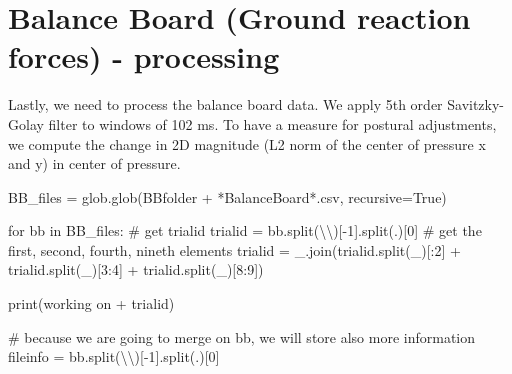\documentclass[
  letterpaper,
  DIV=11,
  numbers=noendperiod]{scrreprt}
\newenvironment{Shaded}{\begin{snugshade}}{\end{snugshade}}
\newcommand{\BuiltInTok}[1]{\textcolor[rgb]{0.00,0.23,0.31}{#1}}
\newcommand{\CharTok}[1]{\textcolor[rgb]{0.13,0.47,0.30}{#1}}
\newcommand{\CommentTok}[1]{\textcolor[rgb]{0.37,0.37,0.37}{#1}}
\newcommand{\ControlFlowTok}[1]{\textcolor[rgb]{0.00,0.23,0.31}{#1}}
\newcommand{\DecValTok}[1]{\textcolor[rgb]{0.68,0.00,0.00}{#1}}
\newcommand{\KeywordTok}[1]{\textcolor[rgb]{0.00,0.23,0.31}{#1}}
\newcommand{\NormalTok}[1]{\textcolor[rgb]{0.00,0.23,0.31}{#1}}
\newcommand{\OperatorTok}[1]{\textcolor[rgb]{0.37,0.37,0.37}{#1}}
\newcommand{\StringTok}[1]{\textcolor[rgb]{0.13,0.47,0.30}{#1}}
\newcommand{\VariableTok}[1]{\textcolor[rgb]{0.07,0.07,0.07}{#1}}
\begin{document}

\chapter{Balance Board (Ground reaction forces) -
processing}\label{balance-board-ground-reaction-forces---processing}

Lastly, we need to process the balance board data. We apply 5th order
Savitzky-Golay filter to windows of 102 ms. To have a measure for
postural adjustments, we compute the change in 2D magnitude (L2 norm of
the center of pressure x and y) in center of pressure.

\begin{Shaded}
\begin{Highlighting}[]
\NormalTok{BB\_files }\OperatorTok{=}\NormalTok{ glob.glob(BBfolder }\OperatorTok{+} \StringTok{\textquotesingle{}*BalanceBoard*.csv\textquotesingle{}}\NormalTok{, recursive}\OperatorTok{=}\VariableTok{True}\NormalTok{)}

\ControlFlowTok{for}\NormalTok{ bb }\KeywordTok{in}\NormalTok{ BB\_files:}
    \CommentTok{\# get trialid}
\NormalTok{    trialid }\OperatorTok{=}\NormalTok{ bb.split(}\StringTok{\textquotesingle{}}\CharTok{\textbackslash{}\textbackslash{}}\StringTok{\textquotesingle{}}\NormalTok{)[}\OperatorTok{{-}}\DecValTok{1}\NormalTok{].split(}\StringTok{\textquotesingle{}.\textquotesingle{}}\NormalTok{)[}\DecValTok{0}\NormalTok{]}
    \CommentTok{\# get the first, second, fourth, nineth elements}
\NormalTok{    trialid }\OperatorTok{=} \StringTok{\textquotesingle{}\_\textquotesingle{}}\NormalTok{.join(trialid.split(}\StringTok{\textquotesingle{}\_\textquotesingle{}}\NormalTok{)[:}\DecValTok{2}\NormalTok{] }\OperatorTok{+}\NormalTok{ trialid.split(}\StringTok{\textquotesingle{}\_\textquotesingle{}}\NormalTok{)[}\DecValTok{3}\NormalTok{:}\DecValTok{4}\NormalTok{] }\OperatorTok{+}\NormalTok{ trialid.split(}\StringTok{\textquotesingle{}\_\textquotesingle{}}\NormalTok{)[}\DecValTok{8}\NormalTok{:}\DecValTok{9}\NormalTok{])}

    \BuiltInTok{print}\NormalTok{(}\StringTok{\textquotesingle{}working on \textquotesingle{}} \OperatorTok{+}\NormalTok{ trialid)}

    \CommentTok{\# because we are going to merge on bb, we will store also more information}
\NormalTok{    fileinfo }\OperatorTok{=}\NormalTok{ bb.split(}\StringTok{\textquotesingle{}}\CharTok{\textbackslash{}\textbackslash{}}\StringTok{\textquotesingle{}}\NormalTok{)[}\OperatorTok{{-}}\DecValTok{1}\NormalTok{].split(}\StringTok{\textquotesingle{}.\textquotesingle{}}\NormalTok{)[}\DecValTok{0}\NormalTok{]}


\end{Highlighting}
\end{Shaded}
\end{document}
